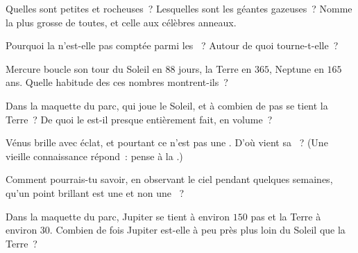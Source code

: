 \begin{exercise}[$\star$]\label{exo:g4:solar-system:3}
Quelles  sont petites et rocheuses~? Lesquelles sont les
géantes gazeuses~? Nomme la plus grosse de toutes, et celle aux
célèbres anneaux.
\end{exercise}

\begin{exercise}[$\star$]\label{exo:g4:solar-system:4}
Pourquoi la  n'est-elle pas comptée parmi les ~? Autour
de quoi tourne-t-elle~?
\end{exercise}

\begin{exercise}[$\star$]\label{exo:g4:solar-system:5}
Mercure boucle son tour du Soleil en $88$ jours, la Terre en $365$,
Neptune en $165$ ans. Quelle habitude des  ces nombres
montrent-ils~?
\end{exercise}

\begin{exercise}[$\star$]\label{exo:g4:solar-system:6}
Dans la maquette du parc, qui joue le Soleil, et à combien de pas se
tient la Terre~? De quoi le  est-il presque
entièrement fait, en volume~?
\end{exercise}

\begin{exercise}[$\star$]\label{exo:g4:solar-system:7}
Vénus brille avec éclat, et pourtant ce n'est pas une . D'où
vient sa ~? (Une vieille connaissance répond~: pense à la
.)
\end{exercise}

\begin{exercise}[$\star$]\label{exo:g4:solar-system:8}
Comment pourrais-tu savoir, en observant le ciel pendant quelques
semaines, qu'un point brillant est une  et non une ~?
\end{exercise}

\begin{exercise}[$\star$]\label{exo:g4:solar-system:9}
Dans la maquette du parc, Jupiter se tient à environ $150$ pas et la
Terre à environ $30$. Combien de fois Jupiter est-elle à peu près
plus loin du Soleil que la Terre~?
\end{exercise}

